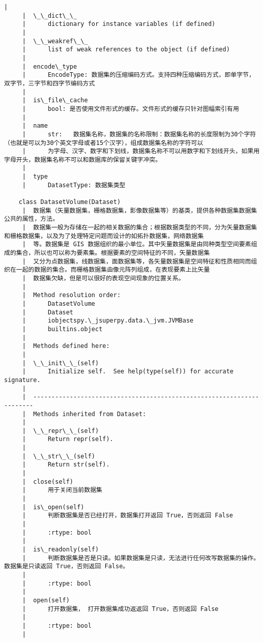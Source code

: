 \documentclass[11pt]{article}
\begin{document}
\begin{Verbatim}[commandchars=\\\{\}]
     |  
     |  \_\_dict\_\_
     |      dictionary for instance variables (if defined)
     |  
     |  \_\_weakref\_\_
     |      list of weak references to the object (if defined)
     |  
     |  encode\_type
     |      EncodeType: 数据集的压缩编码方式。支持四种压缩编码方式，即单字节，双字节，三字节和四字节编码方式
     |  
     |  is\_file\_cache
     |      bool: 是否使用文件形式的缓存。文件形式的缓存只针对图幅索引有用
     |  
     |  name
     |      str:   数据集名称，数据集的名称限制：数据集名称的长度限制为30个字符（也就是可以为30个英文字母或者15个汉字），组成数据集名称的字符可以
     |      为字母、汉字、数字和下划线，数据集名称不可以用数字和下划线开头，如果用字母开头，数据集名称不可以和数据库的保留关键字冲突。
     |  
     |  type
     |      DatasetType: 数据集类型
    
    class DatasetVolume(Dataset)
     |  数据集（矢量数据集，栅格数据集，影像数据集等）的基类，提供各种数据集数据集公共的属性，方法。
     |  数据集一般为存储在一起的相关数据的集合；根据数据类型的不同，分为矢量数据集和栅格数据集，以及为了处理特定问题而设计的如拓扑数据集，网络数据集
     |  等。数据集是 GIS 数据组织的最小单位。其中矢量数据集是由同种类型空间要素组成的集合，所以也可以称为要素集。根据要素的空间特征的不同，矢量数据集
     |  又分为点数据集，线数据集，面数据集等，各矢量数据集是空间特征和性质相同而组织在一起的数据的集合。而栅格数据集由像元阵列组成，在表现要素上比矢量
     |  数据集欠缺，但是可以很好的表现空间现象的位置关系。
     |  
     |  Method resolution order:
     |      DatasetVolume
     |      Dataset
     |      iobjectspy.\_jsuperpy.data.\_jvm.JVMBase
     |      builtins.object
     |  
     |  Methods defined here:
     |  
     |  \_\_init\_\_(self)
     |      Initialize self.  See help(type(self)) for accurate signature.
     |  
     |  ----------------------------------------------------------------------
     |  Methods inherited from Dataset:
     |  
     |  \_\_repr\_\_(self)
     |      Return repr(self).
     |  
     |  \_\_str\_\_(self)
     |      Return str(self).
     |  
     |  close(self)
     |      用于关闭当前数据集
     |  
     |  is\_open(self)
     |      判断数据集是否已经打开，数据集打开返回 True，否则返回 False
     |      
     |      :rtype: bool
     |  
     |  is\_readonly(self)
     |      判断数据集是否是只读。如果数据集是只读，无法进行任何改写数据集的操作。 数据集是只读返回 True，否则返回 False。
     |      
     |      :rtype: bool
     |  
     |  open(self)
     |      打开数据集， 打开数据集成功返返回 True，否则返回 False
     |      
     |      :rtype: bool
     |  

\end{Verbatim}
\end{document}
